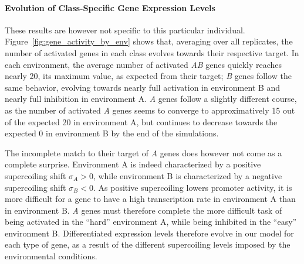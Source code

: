 \paragraph{Evolution of Class-Specific Gene Expression Levels}
These results are however not specific to this particular individual.
Figure~\ref{fig:gene_activity_by_env} shows that, averaging over all replicates, the number of activated genes in each class evolves towards their respective target.
In each environment, the average number of activated \emph{AB} genes quickly reaches nearly 20, its maximum value, as expected from their target; \emph{B} genes follow the same behavior, evolving towards nearly full activation in environment B and nearly full inhibition in environment A.
\emph{A} genes follow a slightly different course, as the number of activated \emph{A} genes seems to converge to approximatively 15 out of the expected 20 in environment A, but continues to decrease towards the expected 0 in environment B by the end of the simulations.

The incomplete match to their target of \emph{A} genes does however not come as a complete surprise.
Environment A is indeed characterized by a positive supercoiling shift $\sigma_A > 0$, while environment B is characterized by a negative supercoiling shift $\sigma_B < 0$.
As positive supercoiling lowers promoter activity, it is more difficult for a gene to have a high transcription rate in environment A than in environment B.
\emph{A} genes must therefore complete the more difficult task of being activated in the ``hard'' environment A, while being inhibited in the ``easy'' environment B.
Differentiated expression levels therefore evolve in our model for each type of gene, as a result of the different supercoiling levels imposed by the environmental conditions.

